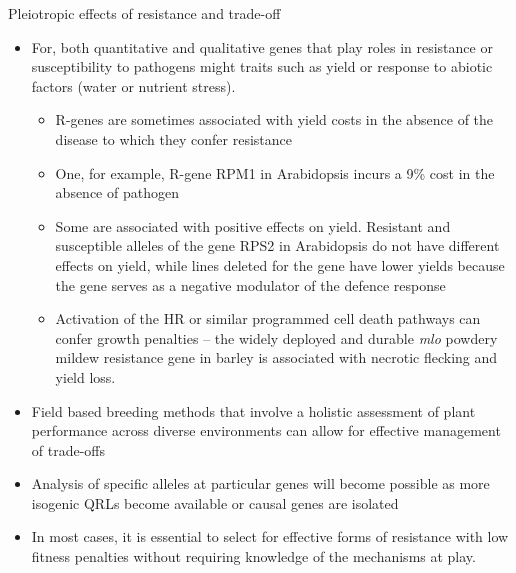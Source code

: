 \documentclass[11pt,dvipsnames,ignorenonframetext,aspectratio=169]{beamer}
\providecommand{\tightlist}{%
  \setlength{\itemsep}{0pt}\setlength{\parskip}{0pt}}
\newcommand{\bitemize}{\begin{itemize}}
\newcommand{\eitemize}{\end{itemize}}
\begin{document}
\begin{frame}{Pleiotropic effects of resistance and trade-off}
\protect\hypertarget{pleiotropic-effects-of-resistance-and-trade-off}{}
\small

\begin{itemize}
\tightlist
\item
  For, both quantitative and qualitative genes that play roles in
  resistance or susceptibility to pathogens might traits such as yield
  or response to abiotic factors (water or nutrient stress). \bitemize
  \scriptsize

  \item

  R-genes are sometimes associated with yield costs in the absence of
  the disease to which they confer resistance

  \item

  One, for example, R-gene RPM1 in Arabidopsis incurs a 9\% cost in the
  absence of pathogen

  \item

  Some are associated with positive effects on yield. Resistant and
  susceptible alleles of the gene RPS2 in Arabidopsis do not have
  different effects on yield, while lines deleted for the gene have
  lower yields because the gene serves as a negative modulator of the
  defence response

  \item

  Activation of the HR or similar programmed cell death pathways can
  confer growth penalties -- the widely deployed and durable
  \textit{mlo} powdery mildew resistance gene in barley is associated
  with necrotic flecking and yield loss. \eitemize
\item
  Field based breeding methods that involve a holistic assessment of
  plant performance across diverse environments can allow for effective
  management of trade-offs
\item
  Analysis of specific alleles at particular genes will become possible
  as more isogenic QRLs become available or causal genes are isolated
\item
  In most cases, it is essential to select for effective forms of
  resistance with low fitness penalties without requiring knowledge of
  the mechanisms at play.
\end{itemize}
\end{frame}
\end{document}
